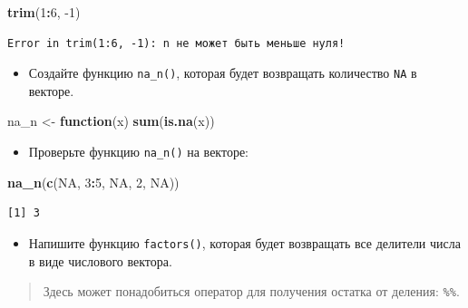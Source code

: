 \documentclass[
]{book}
\newenvironment{Shaded}{\begin{snugshade}}{\end{snugshade}}
\newcommand{\ControlFlowTok}[1]{\textcolor[rgb]{0.13,0.29,0.53}{\textbf{#1}}}
\newcommand{\DecValTok}[1]{\textcolor[rgb]{0.00,0.00,0.81}{#1}}
\newcommand{\KeywordTok}[1]{\textcolor[rgb]{0.13,0.29,0.53}{\textbf{#1}}}
\newcommand{\NormalTok}[1]{#1}
\newcommand{\OperatorTok}[1]{\textcolor[rgb]{0.81,0.36,0.00}{\textbf{#1}}}
\newcommand{\OtherTok}[1]{\textcolor[rgb]{0.56,0.35,0.01}{#1}}
\newcommand{\StringTok}[1]{\textcolor[rgb]{0.31,0.60,0.02}{#1}}
\providecommand{\tightlist}{%
  \setlength{\itemsep}{0pt}\setlength{\parskip}{0pt}}
\begin{document}
\begin{Shaded}
\begin{Highlighting}[]
\KeywordTok{trim}\NormalTok{(}\DecValTok{1}\OperatorTok{:}\DecValTok{6}\NormalTok{, }\DecValTok{-1}\NormalTok{)}
\end{Highlighting}
\end{Shaded}

\begin{verbatim}
Error in trim(1:6, -1): n не может быть меньше нуля!
\end{verbatim}

\begin{itemize}
\tightlist
\item
  Создайте функцию \texttt{na\_n()}, которая будет возвращать количество \texttt{NA} в векторе.
\end{itemize}

\begin{Shaded}
\begin{Highlighting}[]
\NormalTok{na_n <-}\StringTok{ }\ControlFlowTok{function}\NormalTok{(x) }\KeywordTok{sum}\NormalTok{(}\KeywordTok{is.na}\NormalTok{(x))}
\end{Highlighting}
\end{Shaded}

\begin{itemize}
\tightlist
\item
  Проверьте функцию \texttt{na\_n()} на векторе:
\end{itemize}

\begin{Shaded}
\begin{Highlighting}[]
\KeywordTok{na_n}\NormalTok{(}\KeywordTok{c}\NormalTok{(}\OtherTok{NA}\NormalTok{, }\DecValTok{3}\OperatorTok{:}\DecValTok{5}\NormalTok{, }\OtherTok{NA}\NormalTok{, }\DecValTok{2}\NormalTok{, }\OtherTok{NA}\NormalTok{))}
\end{Highlighting}
\end{Shaded}

\begin{verbatim}
[1] 3
\end{verbatim}

\begin{itemize}
\tightlist
\item
  Напишите функцию \texttt{factors()}, которая будет возвращать все делители числа в виде числового вектора.
\end{itemize}

\begin{quote}
Здесь может понадобиться оператор для получения остатка от деления: \texttt{\%\%}.
\end{quote}
\end{document}
